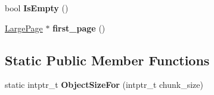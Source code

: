 \begin{DoxyCompactItemize}
\item 
bool {\bfseries Is\+Empty} ()\hypertarget{classv8_1_1internal_1_1_large_object_space_a1540b1b446a3ce5210b8b6ab9e02aad0}{}\label{classv8_1_1internal_1_1_large_object_space_a1540b1b446a3ce5210b8b6ab9e02aad0}

\item 
\hyperlink{classv8_1_1internal_1_1_large_page}{Large\+Page} $\ast$ {\bfseries first\+\_\+page} ()\hypertarget{classv8_1_1internal_1_1_large_object_space_a238ecdf0c67e7880af4afa23e6acec29}{}\label{classv8_1_1internal_1_1_large_object_space_a238ecdf0c67e7880af4afa23e6acec29}

\end{DoxyCompactItemize}
\subsection*{Static Public Member Functions}
\begin{DoxyCompactItemize}
\item 
static intptr\+\_\+t {\bfseries Object\+Size\+For} (intptr\+\_\+t chunk\+\_\+size)\hypertarget{classv8_1_1internal_1_1_large_object_space_ab02f8331007158171f81c7f511e33f32}{}\label{classv8_1_1internal_1_1_large_object_space_ab02f8331007158171f81c7f511e33f32}

\end{DoxyCompactItemize}
